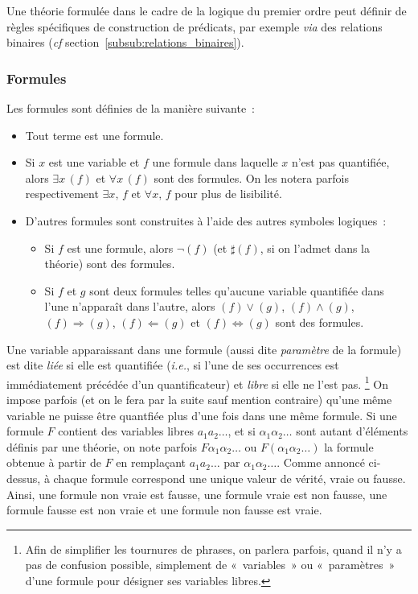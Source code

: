 Une théorie formulée dans le cadre de la logique du premier ordre peut définir de règles spécifiques de construction de prédicats, par exemple \emph{via} des relations binaires (\emph{cf} section~\ref{subsub:relations_binaires}).

\subsubsection{Formules}

Les formules sont définies de la manière suivante : 
\begin{itemize}
    \item Tout terme est une formule. 
    \item Si $x$ est une variable et $f$ une formule dans laquelle $x$ n'est pas quantifiée, alors $\exists x \, (f)$ et $\forall x \, (f)$ sont des formules. 
        On les notera parfois respectivement $\exists x, \, f$ et $\forall x, \, f$ pour plus de lisibilité.
    \item D'autres formules sont construites à l'aide des autres symboles logiques : 
    \begin{itemize}
        \item Si $f$ est une formule, alors $\neg (f)$ (et $\sharp (f)$, si on l'admet dans la théorie) sont des formules.
        \item Si $f$ et $g$ sont deux formules telles qu'aucune variable quantifiée dans l'une n'apparaît dans l'autre, alors $(f) \vee (g)$, $(f) \wedge (g)$, $(f) \Rightarrow (g)$, $(f) \Leftarrow (g)$ et $(f) \Leftrightarrow (g)$ sont des formules.
    \end{itemize}
\end{itemize}

Une variable apparaissant dans une formule (aussi dite \textit{paramètre} de la formule) est dite \textit{liée} si elle est quantifiée (\textit{i.e.}, si l'une de ses occurrences est immédiatement précédée d'un quantificateur) et \textit{libre} si elle ne l'est pas.%
\footnote{
    Afin de simplifier les tournures de phrases, on parlera parfois, quand il n'y a pas de confusion possible, simplement de « variables » ou « paramètres » d'une formule pour désigner ses variables libres. 
}
On impose parfois (et on le fera par la suite sauf mention contraire) qu'une même variable ne puisse être quantfiée plus d'une fois dans une même formule.
Si une formule $F$ contient des variables libres $a_1 a_2 \dots$, et si $\alpha_1 \alpha_2 \dots$ sont autant d'éléments définis par une théorie, on note parfois $F \alpha_1 \alpha_2 \dots$ ou $F (\alpha_1 \alpha_2 \dots)$ la formule obtenue à partir de $F$ en remplaçant $a_1 a_2 \dots$ par $\alpha_1 \alpha_2 \dots$.
Comme annoncé ci-dessus, à chaque formule correspond une unique valeur de vérité, vraie ou fausse. 
Ainsi, une formule non vraie est fausse, une formule vraie est non fausse, une formule fausse est non vraie et une formule non fausse est vraie.

